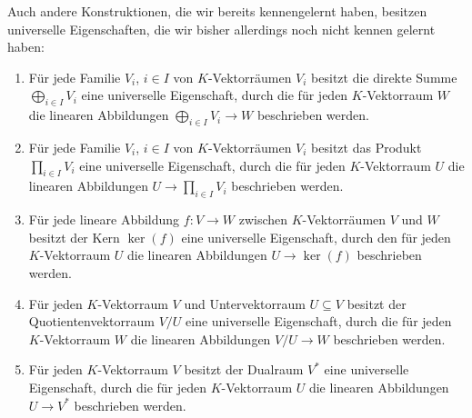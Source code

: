 \begin{remark}
  Auch andere Konstruktionen, die wir bereits kennengelernt haben, besitzen universelle Eigenschaften, die wir bisher allerdings noch nicht kennen gelernt haben:
  \begin{enumerate}
    \item
      Für jede Familie $V_i$, $i \in I$ von $K$-Vektorräumen $V_i$ besitzt die direkte Summe $\bigoplus_{i \in I} V_i$ eine universelle Eigenschaft, durch die für jeden $K$-Vektorraum $W$ die linearen Abbildungen $\bigoplus_{i \in I} V_i \to W$ beschrieben werden.
    \item
      Für jede Familie $V_i$, $i \in I$ von $K$-Vektorräumen $V_i$ besitzt das Produkt $\prod_{i \in I} V_i$ eine universelle Eigenschaft, durch die für jeden $K$-Vektorraum $U$ die linearen Abbildungen $U \to \prod_{i \in I} V_i$ beschrieben werden.
    \item
      Für jede lineare Abbildung $f \colon V \to W$ zwischen $K$-Vektorräumen $V$ und $W$ besitzt der Kern $\ker(f)$ eine universelle Eigenschaft, durch den für jeden $K$-Vektorraum $U$ die linearen Abbildungen $U \to \ker(f)$ beschrieben werden.
    \item
      Für jeden $K$-Vektorraum $V$ und Untervektorraum $U \subseteq V$ besitzt der Quotientenvektorraum $V/U$ eine universelle Eigenschaft, durch die für jeden $K$-Vektorraum $W$ die linearen Abbildungen $V/U \to W$ beschrieben werden.
    \item
      Für jeden $K$-Vektorraum $V$ besitzt der Dualraum $V^*$ eine universelle Eigenschaft, durch die für jeden $K$-Vektorraum $U$ die linearen Abbildungen $U \to V^*$ beschrieben werden.
  \end{enumerate}
\end{remark}


